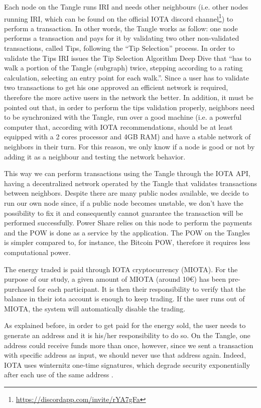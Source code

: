 Each node on the Tangle runs \ac{IRI} and needs other neighbours (i.e. other nodes running \ac{IRI}, which can be found on the official IOTA discord channel\footnote{\url{https://discordapp.com/invite/rYA7gFa}}) to perform a transaction. In other words, the Tangle works as follow: one node performs a transaction and pays for it by validating two other non-validated transactions, called Tips, following the “Tip Selection” process. In order to validate the Tips \ac{IRI} issues the Tip Selection Algorithm Deep Dive that “has to walk a portion of the Tangle (subgraph) twice, stepping according to a rating calculation, selecting an entry point for each walk.”\cite{iotatips}. Since a user has to validate two transactions to get his one approved an efficient network is required, therefore the more active users in the network the better. In addition, it must be pointed out that, in order to perform the tips validation properly, neighbors need to be synchronized with the Tangle, run over a good machine (i.e. a powerful computer that, according with IOTA recommendations, should be at least equipped with a 2 cores processor and 4GB RAM) and have a stable network of neighbors in their turn. For this reason, we only know if a node is good or not by adding it as a neighbour and testing the network behavior. 


This way we can perform transactions using the Tangle through the IOTA \ac{API}, having a decentralized network operated by the Tangle that validates transactions between neighbors. Despite there are many public nodes available, we decide to run our own node since, if a public node becomes unstable, we don't have the possibility to fix it and consequently cannot guarantee the transaction will be performed successfully.  Power Share relies on this node to perform the payments and the \ac{POW} is done as a service by the application. The POW on the Tangles is simpler compared to, for instance, the Bitcoin \ac{POW}, therefore it requires less computational power.



The energy traded is paid through IOTA cryptocurrency (MIOTA). For the purpose of our study, a given amount of MIOTA (around 10€) has been pre-purchased for each participant. It is then their responsibility to verify that the balance in their iota account is enough to keep trading. If the user runs out of MIOTA, the system will automatically disable the trading. 


As explained before, in order to get paid for the energy sold, the user needs to generate an address and it is his/her responsibility to do so. On the Tangle, one address could receive funds more than once, however, since we sent a transaction with specific address as input, we should never use that address again. Indeed, IOTA uses winternitz one-time signatures, which degrade security exponentially after each use of the same address \cite{iotaseeds}.



